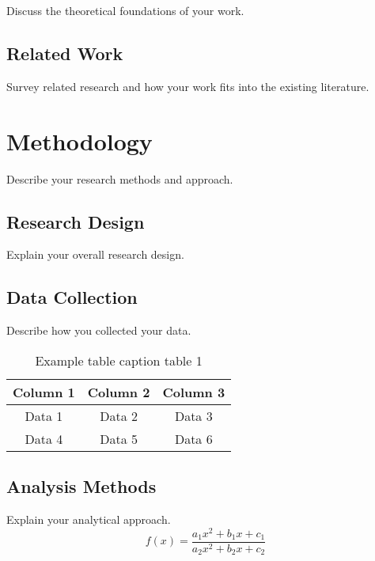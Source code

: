 Discuss the theoretical foundations of your work.

\section{Related Work}

Survey related research and how your work fits into the existing literature.

\chapter{Methodology}

Describe your research methods and approach.

\section{Research Design}

Explain your overall research design.

\section{Data Collection}

Describe how you collected your data.

\begin{table}[ht]
    \centering
    \begin{tabular}{|c|c|c|}
        \hline
        Column 1 & Column 2 & Column 3 \\
        \hline
        Data 1 & Data 2 & Data 3 \\
        Data 4 & Data 5 & Data 6 \\
        \hline
    \end{tabular}
    \caption{Example table caption table 1}
    \label{tab:example1}
\end{table}

\section{Analysis Methods}

Explain your analytical approach.
\begin{equation}
    f(x) = \frac{a_1 x^2 + b_1 x + c_1}{a_2 x^2 + b_2 x + c_2}
\end{equation}

